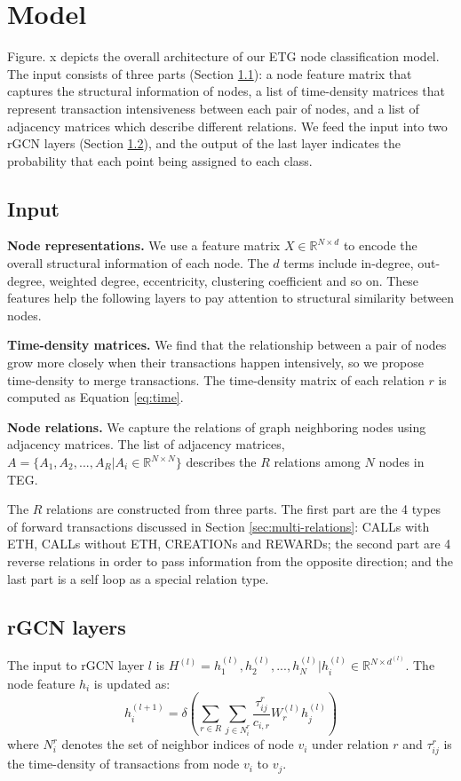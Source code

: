 
\section{Model}
Figure. x depicts the overall architecture of our ETG node classification model. The input consists of three parts (Section \ref{sec:input}): a node feature matrix that captures the structural information of nodes, a list of time-density matrices that represent transaction intensiveness between each pair of nodes, and a list of adjacency matrices which describe different relations. We feed the input into two rGCN layers (Section \ref{sec:rGCN layers}), and the output of the last layer indicates the probability that each point being assigned to each class.

\subsection{Input}
\label{sec:input}
\textbf{Node representations.} We use a feature matrix $X \in \mathbb{R}^{N \times d}$ to encode the overall structural information of each node. The $d$ terms include in-degree, out-degree, weighted degree, eccentricity, clustering coefficient and so on. These features help the following layers to pay attention to structural similarity between nodes.

\textbf{Time-density matrices.} We find that the relationship between a pair of nodes grow more closely when their transactions happen intensively, so we propose time-density to merge transactions. The time-density matrix of each relation $r$ is computed as Equation \ref{eq:time}.

\textbf{Node relations.} We capture the relations of graph neighboring nodes using adjacency matrices. The list of adjacency matrices, $A=\{A_1,A_2,...,A_R|A_i\in \mathbb{R}^{N \times N}\}$ describes the $R$ relations among $N$ nodes in TEG.

The $R$ relations are constructed from three parts. The first part are the 4 types of forward transactions discussed in Section \ref{sec:multi-relations}: CALLs with ETH, CALLs without ETH, CREATIONs and REWARDs; the second part are 4 reverse relations in order to pass information from the opposite direction; and the last part is a self loop as a special relation type.

\subsection{rGCN layers}
\label{sec:rGCN layers}
The input to rGCN layer $l$ is $H^{(l)}={h_1^{(l)},h_2^{(l)},...,h_N^{(l)}|h_i^{(l)}\in \mathbb{R}^{N \times d^{(l)}}}$. The node feature $h_i$ is updated as:
\begin{equation}
h_i^{(l+1)}=\delta(\sum_{r\in R} \sum_{j \in N_i^r} \frac{\tau_{ij}^r}{c_{i,r}}W_r^{(l)}h_j^{(l)})
\end{equation}
where $N_i^r$ denotes the set of neighbor indices of node $v_i$ under relation $r$ and $\tau_{ij}^r$ is the time-density of transactions from node $v_i$ to $v_j$. 

